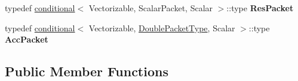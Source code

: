 \begin{DoxyCompactItemize}
typedef \hyperlink{struct_eigen_1_1internal_1_1conditional}{conditional}$<$ Vectorizable, Scalar\+Packet, Scalar $>$\+::type {\bfseries Res\+Packet}
\item 
\mbox{\label{class_eigen_1_1internal_1_1gebp__traits_3_01std_1_1complex_3_01_real_scalar_01_4_00_01std_1_1com3fbe501975c876a010def81ad2701521_ae1ad8db4cf9a74d6ce7027fd1a2e0912}} 
typedef \hyperlink{struct_eigen_1_1internal_1_1conditional}{conditional}$<$ Vectorizable, \hyperlink{struct_eigen_1_1internal_1_1_double_packet}{Double\+Packet\+Type}, Scalar $>$\+::type {\bfseries Acc\+Packet}
\end{DoxyCompactItemize}
\subsection*{Public Member Functions}
